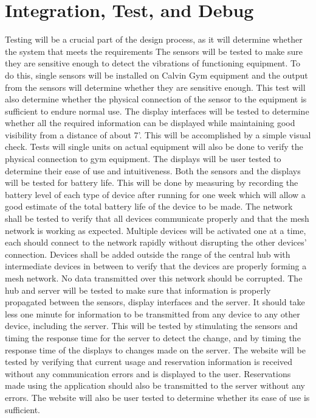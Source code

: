 \documentclass[ppfs.tex]{template/subfiles}
\begin{document}
\section{Integration, Test, and Debug}

Testing will be a crucial part of the design process, as it will determine whether the system that meets the requirements 
The sensors will be tested to make sure they are sensitive enough to detect the vibrations of functioning equipment.  To do this, single sensors will be installed on Calvin Gym equipment and the output from the sensors will determine whether they are sensitive enough. This test will also determine whether the physical connection of the sensor to the equipment is sufficient to endure normal use.
The display interfaces will be tested to determine whether all the required information can be displayed while maintaining good visibility from a distance of about 7’. This will be accomplished by a simple visual check. Tests will single units on actual equipment will also be done to verify the physical connection to gym equipment. The displays will be user tested to determine their ease of use and intuitiveness.
Both the sensors and the displays will be tested for battery life. This will be done by measuring by recording the battery level of each type of device after running for one week which will allow a good estimate of the total battery life of the device to be made.
The network shall be tested to verify that all devices communicate properly and that the mesh network is working as expected. Multiple devices will be activated one at a time, each should connect to the network rapidly without disrupting the other devices’ connection. Devices shall be added outside the range of the central hub with intermediate devices in between to verify that the devices are properly forming a mesh network. No data transmitted over this network should be corrupted.
The hub and server will be tested to make sure that information is properly propagated between the sensors, display interfaces and the server. It should take less one minute for information to be transmitted from any device to any other device, including the server. This will be tested by stimulating the sensors and timing the response time for the server to detect the change, and by timing the response time of the displays to changes made on the server. 
The website will be tested by verifying that current usage and reservation information is received without any communication errors and is displayed to the user. Reservations made using the application should also be transmitted to the server without any errors. The website will also be user tested to determine whether its ease of use is sufficient.
\end{document}
